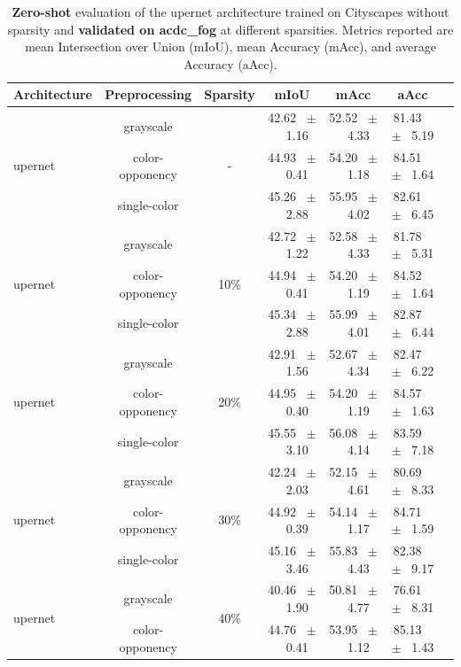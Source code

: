 \begin{table}[h]
  \centering
  \caption{\textbf{Zero-shot} evaluation of the upernet architecture trained on Cityscapes without sparsity and \textbf{validated on acdc_fog} at different sparsities. Metrics reported are mean Intersection over Union (mIoU), mean Accuracy (mAcc), and average Accuracy (aAcc).}
  \begin{tabular}{@{}lccc ccc@{}}
    \toprule
    Architecture & Preprocessing & Sparsity & mIoU & mAcc & aAcc \\
    \midrule
    \multirow{3}{*}{upernet} & grayscale & \multirow{3}{*}{-} & 42.62 ~$\pm$~ 1.16 & 52.52 ~$\pm$~ 4.33 & 81.43 ~$\pm$~ 5.19 \\
    & color-opponency &  & 44.93 ~$\pm$~ 0.41 & 54.20 ~$\pm$~ 1.18 & 84.51 ~$\pm$~ 1.64 \\
    & single-color &  & 45.26 ~$\pm$~ 2.88 & 55.95 ~$\pm$~ 4.02 & 82.61 ~$\pm$~ 6.45 \\
    \midrule
    \multirow{3}{*}{upernet} & grayscale & \multirow{3}{*}{10\%} & 42.72 ~$\pm$~ 1.22 & 52.58 ~$\pm$~ 4.33 & 81.78 ~$\pm$~ 5.31 \\
    & color-opponency &  & 44.94 ~$\pm$~ 0.41 & 54.20 ~$\pm$~ 1.19 & 84.52 ~$\pm$~ 1.64 \\
    & single-color &  & 45.34 ~$\pm$~ 2.88 & 55.99 ~$\pm$~ 4.01 & 82.87 ~$\pm$~ 6.44 \\
    \midrule
    \multirow{3}{*}{upernet} & grayscale & \multirow{3}{*}{20\%} & 42.91 ~$\pm$~ 1.56 & 52.67 ~$\pm$~ 4.34 & 82.47 ~$\pm$~ 6.22 \\
    & color-opponency &  & 44.95 ~$\pm$~ 0.40 & 54.20 ~$\pm$~ 1.19 & 84.57 ~$\pm$~ 1.63 \\
    & single-color &  & 45.55 ~$\pm$~ 3.10 & 56.08 ~$\pm$~ 4.14 & 83.59 ~$\pm$~ 7.18 \\
    \midrule
    \multirow{3}{*}{upernet} & grayscale & \multirow{3}{*}{30\%} & 42.24 ~$\pm$~ 2.03 & 52.15 ~$\pm$~ 4.61 & 80.69 ~$\pm$~ 8.33 \\
    & color-opponency &  & 44.92 ~$\pm$~ 0.39 & 54.14 ~$\pm$~ 1.17 & 84.71 ~$\pm$~ 1.59 \\
    & single-color &  & 45.16 ~$\pm$~ 3.46 & 55.83 ~$\pm$~ 4.43 & 82.38 ~$\pm$~ 9.17 \\
    \midrule
    \multirow{3}{*}{upernet} & grayscale & \multirow{3}{*}{40\%} & 40.46 ~$\pm$~ 1.90 & 50.81 ~$\pm$~ 4.77 & 76.61 ~$\pm$~ 8.31 \\
    & color-opponency &  & 44.76 ~$\pm$~ 0.41 & 53.95 ~$\pm$~ 1.12 & 85.13 ~$\pm$~ 1.43 \\

\end{tabular}
\end{table}
